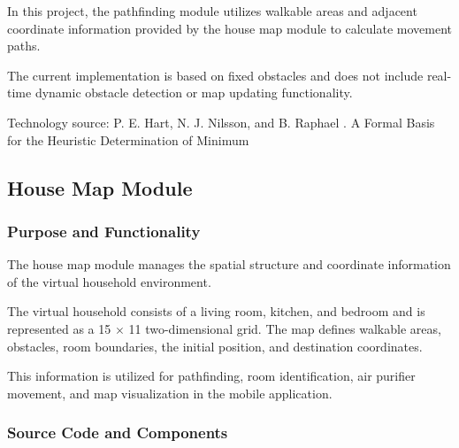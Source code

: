 \documentclass[conference]{IEEEtran}
\begin{document}
In this project, the pathfinding module utilizes walkable areas and adjacent coordinate information provided by the house map module to calculate movement paths.

The current implementation is based on fixed obstacles and does not include real-time dynamic obstacle detection or map updating functionality.

Technology source: P. E. Hart, N. J. Nilsson, and B. Raphael \cite{ref12}. A Formal Basis for the Heuristic Determination of Minimum

\subsection{House Map Module}

\subsubsection{Purpose and Functionality}

The house map module manages the spatial structure and coordinate information of the virtual household environment.

The virtual household consists of a living room, kitchen, and bedroom and is represented as a 15 \ensuremath{\times} 11 two-dimensional grid. The map defines walkable areas, obstacles, room boundaries, the initial position, and destination coordinates.

This information is utilized for pathfinding, room identification, air purifier movement, and map visualization in the mobile application.

\subsubsection{Source Code and Components}
\end{document}
